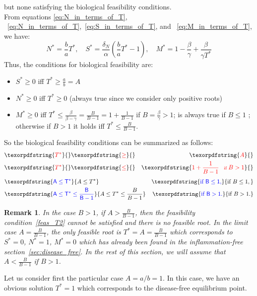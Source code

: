\documentclass[a4paper, 12pt]{article}
\newtheorem{rem}{Remark}[section]
\providecommand{\DIFaddtex}[1]{{\protect\color{blue} \sf #1}} %
\providecommand{\DIFdeltex}[1]{{\protect\color{red} \scriptsize #1}} %
\providecommand{\DIFaddbegin}{} %
\providecommand{\DIFaddend}{} %
\providecommand{\DIFdelbegin}{} %
\providecommand{\DIFdelend}{} %
\providecommand{\DIFadd}[1]{\texorpdfstring{\DIFaddtex{#1}}{#1}} %
\providecommand{\DIFdel}[1]{\texorpdfstring{\DIFdeltex{#1}}{}} %
\begin{document}
but none satisfying the biological feasibility conditions.\smallskip\\
From equations\DIFdelbegin \DIFdel{\eqref{eq:N_in_terms_of_T}, }\DIFdelend \DIFaddbegin \DIFadd{~\eqref{eq:N_in_terms_of_T},~}\DIFaddend \eqref{eq:S_in_terms_of_T}, and\DIFaddbegin \DIFadd{~}\DIFaddend \eqref{eq:M_in_terms_of_T}, we have: 
\[N^* = \frac{b}{a} T^*, \quad S^* = \frac{\delta_N}{\alpha} \left(\frac{b}{a} T^* - 1\right), \quad M^* = 1 - \frac{\beta}{\gamma} + \frac{\beta}{\gamma T^*}
\]
Thus, the conditions for biological feasibility are:
\begin{itemize}
\item $S^* \geq 0$ iff $T^* \geq \frac{a}{b} = A$  
\item $N^* \geq 0$  iff $T^* \geq 0$ (always true since we consider only positive roots)
\item $M^* \geq 0$ \DIFdelbegin \DIFdel{iff $T^* \leq \frac{\beta}{\beta - \gamma}= \frac{B}{B-1}= 1 + \frac{1}{B-1}$ if $B= \frac{\beta}{\gamma} > 1$; }\DIFdelend \DIFaddbegin \DIFadd{is }\DIFaddend always true if $B \leq 1$\DIFaddbegin \DIFadd{; otherwise if $B > 1$ it holds iff $T^* \leq  \frac{B}{B-1}$}\DIFaddend .
\end{itemize}
So the biological feasibility conditions can be summarized as follows:
\DIFdelbegin \begin{align*}
\DIFdel{T^* }&\DIFdel{\geq}& \DIFdel{A \label{feas_T1} }\\
\DIFdel{T^* }&\DIFdel{\leq}& \DIFdel{1 + \frac{1}{B-1} \quad \text{if } B > 1 \label{feas_T2}
}\end{align*}%
\DIFdelend \DIFaddbegin \begin{align}
&\DIFadd{A  \leq  T^*   }&\DIFadd{\text{if } B \leq 1, \label{feas_T1} }\\
&\DIFadd{A  \leq  T^*   \leq  \frac{B}{B-1}}&  \DIFadd{\text{if } B > 1. \label{feas_T2}
}\end{align}\DIFaddend 
\DIFaddbegin \begin{rem}
\DIFadd{In the case $B>1$, if $A > \frac{B}{B-1}$, then     the feasibility condition~\eqref{feas_T2} cannot be satisfied and there is no feasible root. In the limit case $A = \frac{B}{B-1}$, the only feasible root is $T^* = A = \frac{B}{B-1}$
 which corresponds to $S^* = 0$, $N^* = 1$, $M^* = 0$ which has already been found in the inflammation-free section~\ref{sec:disease_free}. In the rest of this section, we will assume that $A < \frac{B}{B-1}$ if $B > 1$.
}\end{rem}
\DIFaddend Let us consider first the particular case $A = a/b = 1$. In this case, we have an obvious solution $T^* = 1$ which corresponds to the disease-free equilibrium point.
\end{document}
